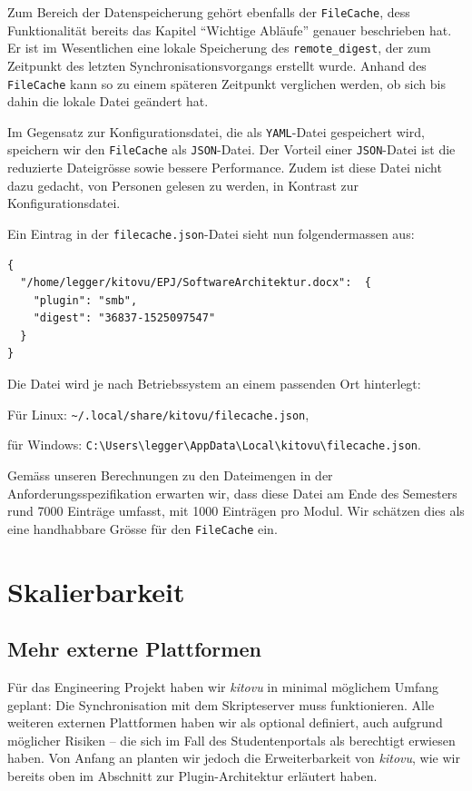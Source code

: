 \documentclass[a4paper]{article}
\let\oldsection\section
\renewcommand\section{\clearpage\oldsection}
\begin{document}
Zum Bereich der Datenspeicherung gehört ebenfalls der \verb|FileCache|, dess Funktionalität bereits das Kapitel ``Wichtige Abläufe'' genauer beschrieben hat. Er ist im Wesentlichen eine lokale Speicherung des \verb|remote_digest|, der zum Zeitpunkt des letzten Synchronisationsvorgangs erstellt wurde. Anhand des \verb|FileCache| kann so zu einem späteren Zeitpunkt verglichen werden, ob sich bis dahin die lokale Datei geändert hat.

Im Gegensatz zur Konfigurationsdatei, die als \verb|YAML|-Datei gespeichert wird, speichern wir den \verb|FileCache| als \verb|JSON|-Datei. Der Vorteil einer \verb|JSON|-Datei ist die reduzierte Dateigrösse sowie bessere Performance. Zudem ist diese Datei nicht dazu gedacht, von Personen gelesen zu werden, in Kontrast zur Konfigurationsdatei.

Ein Eintrag in der \verb|filecache.json|-Datei sieht nun folgendermassen aus:

\begin{verbatim}
{
  "/home/legger/kitovu/EPJ/SoftwareArchitektur.docx":  {
    "plugin": "smb",
    "digest": "36837-1525097547"
  }
}
\end{verbatim}

Die Datei wird je nach Betriebssystem an einem passenden Ort hinterlegt: 

Für Linux: \verb|~/.local/share/kitovu/filecache.json|,

für Windows: \verb|C:\Users\legger\AppData\Local\kitovu\filecache.json|.

Gemäss unseren Berechnungen zu den Dateimengen in der Anforderungsspezifikation erwarten wir, dass diese Datei am Ende des Semesters rund 7000 Einträge umfasst, mit 1000 Einträgen pro Modul. Wir schätzen dies als eine handhabbare Grösse für den \verb|FileCache| ein.

\section{Skalierbarkeit}

\subsection{Mehr externe Plattformen}

Für das Engineering Projekt haben wir \emph{kitovu} in minimal möglichem Umfang geplant: Die Synchronisation mit dem Skripteserver muss funktionieren. Alle weiteren externen Plattformen haben wir als optional definiert, auch aufgrund möglicher Risiken -- die sich im Fall des Studentenportals als berechtigt erwiesen haben. Von Anfang an planten wir jedoch die Erweiterbarkeit von \emph{kitovu}, wie wir bereits oben im Abschnitt zur Plugin-Architektur erläutert haben. 
\end{document}
